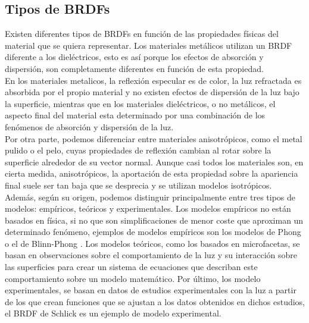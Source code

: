     \egroup


    \subsection{Tipos de BRDFs}
    Existen diferentes tipos de BRDFs en funci\'on de las propiedades f\'isicas del material que se quiera representar. Los
    materiales met\'alicos utilizan un BRDF diferente a los diel\'ectricos, esto es as\'i porque los efectos de absorci\'on y
    dispersi\'on, son completamente diferentes en funci\'on de esta propiedad.\\

    En los materiales metalicos, la reflexi\'on especular es de color, la luz refractada es absorbida por el propio material
    y no existen efectos de dispersi\'on de la luz bajo la superficie, mientras que en los materiales diel\'ectricos, o no
    met\'alicos, el aspecto final del material esta determinado por una combinaci\'on de los fen\'omenos de absorci\'on y
    dispersi\'on de la luz.\\

    Por otra parte, podemos diferenciar entre materiales anisotr\'opicos, como el metal pulido o el pelo, cuyas propiedades
    de reflexi\'on cambian al rotar sobre la superficie alrededor de su vector normal. Aunque casi todos los materiales son, en cierta medida, anisotr\'opicos, la
    aportaci\'on de esta propiedad sobre la apariencia final suele ser tan baja que se desprecia y se utilizan modelos
    isotr\'opicos.\\

    Adem\'as, seg\'un su origen, podemos distinguir principalmente entre tres tipos de modelos: emp\'iricos, te\'oricos y
    experimentales. Los modelos emp\'iricos no est\'an basados en f\'isica, si no que son simplificaciones de menor coste que
    aproximan un determinado fen\'omeno, ejemplos de modelos emp\'iricos son los modelos de Phong \autocite{phong} o el
    de Blinn-Phong \autocite{blinnphong}. Los modelos te\'oricos, como los basados en microfacetas, se basan en observaciones sobre el comportamiento de la luz y su
    interacci\'on sobre las superficies para crear un sistema de ecuaciones que describan este comportamiento sobre un modelo
    matem\'atico. Por \'ultimo, los modelo experimentales, se basan en datos de estudios experimentales con la luz a partir de los
    que crean funciones que se ajustan a los datos obtenidos en dichos estudios, el BRDF de Schlick es un ejemplo de modelo
    experimental.

